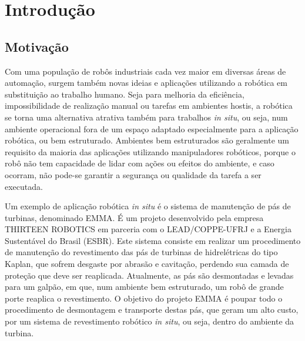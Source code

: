 \chapter{Introdução}

% 

\section{Motivação}

Com uma população de robôs industriais cada vez maior em diversas áreas de
automação, surgem também novas ideias e aplicações utilizando a robótica em
substituição ao trabalho humano. Seja para melhoria da eficiência,
impossibilidade de realização manual ou tarefas em ambientes hostis, a robótica
se torna uma alternativa atrativa também para trabalhos \textit{in situ}, ou
seja, num ambiente operacional fora de um espaço adaptado especialmente para a
aplicação robótica, ou bem estruturado.
Ambientes bem estruturados são geralmente um requisito da maioria das aplicações
utilizando manipuladores robóticos, porque o robô não tem capacidade de lidar
com ações ou efeitos do ambiente, e caso ocorram, não pode-se garantir a
segurança ou qualidade da tarefa a ser executada.

Um exemplo de aplicação robótica \textit{in situ} é o sistema de manutenção de
pás de turbinas, denominado EMMA\cite{freitas2017state}.
É um projeto desenvolvido pela empresa THIRTEEN ROBOTICS em parceria com o
LEAD/COPPE-UFRJ e a Energia Sustentável do Brasil (ESBR). Este sistema consiste
em realizar um procedimento de manutenção do revestimento das pás de turbinas de
hidrelétricas do tipo Kaplan, que sofrem desgaste por abrasão e cavitação,
perdendo sua camada de proteção que deve ser reaplicada. Atualmente, as pás são
desmontadas e levadas para um galpão, em que, num ambiente bem estruturado, um
robô de grande porte reaplica o revestimento.
O objetivo do projeto EMMA é poupar todo o procedimento de desmontagem e
transporte destas pás, que geram um alto custo, por um sistema de revestimento
robótico \textit{in situ}, ou seja, dentro do ambiente da turbina.


